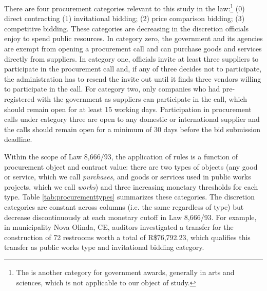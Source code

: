 \documentclass[11pt]{article}
\begin{document}
There are four procurement categories relevant to this study in the law:\footnote{The is another category for government awards, generally in arts and sciences, which is not applicable to our object of study.} (0) direct contracting (1) invitational bidding; (2) price comparison bidding; (3) competitive bidding. These categories are decreasing in the discretion officials enjoy to spend public resources. In category zero, the government and its agencies are exempt from opening a procurement call and can purchase goods and services directly from suppliers. In category one, officials invite at least three suppliers to participate in the procurement call and, if any of three decides not to participate, the administration has to resend the invite out until it finds three vendors willing to participate in the call. For category two, only companies who had pre-registered with the government as suppliers can participate in the call, which should remain open for at least 15 working days. Participation in procurement calls under category three are open to any domestic or international supplier and the calls should remain open for a minimum of 30 days before the bid submission deadline.

Within the scope of Law 8,666/93, the application of rules is a function of procurement object and contract value: there are two types of objects (any good or service, which we call \emph{purchases}, and goods or services used in public works projects, which we call \emph{works}) and three increasing monetary thresholds for each type. Table \ref{tab:procurementtypes} summarizes these categories. The discretion categories are constant across columns (i.e. the same regardless of type) but decrease discontinuously at each monetary cutoff in Law 8,666/93. For example, in municipality Nova Olinda, CE, auditors investigated a transfer for the construction of 72 restrooms worth a total of R\$76,792.23, which qualifies this transfer as public works type and invitational bidding category.


\end{document}
